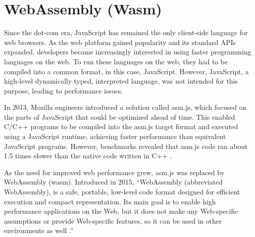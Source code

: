 \chapter{WebAssembly (Wasm)}
\label{chap:wasm}

Since the dot-com era, JavaScript has remained the only client-side language for web browsers. 
As the web platform gained popularity and its standard APIs expanded, developers became increasingly interested in using faster programming languages on the web. 
To run these languages on the web, they had to be compiled into a common format, in this case, JavaScript. However, JavaScript, a high-level dynamically typed, interpreted language, was not intended for this purpose, leading to performance issues.

In 2013, Mozilla engineers introduced a solution called asm.js, which focused on the parts of JavaScript that could be optimized ahead of time. This enabled C/C++ programs to be compiled into the asm.js target format and executed using a JavaScript runtime, 
achieving faster performance than equivalent JavaScript programs. However, benchmarks revealed that asm.js code ran about 1.5 times slower than the native code written in C++ \cite{zakai_2013_gap}.

As the need for improved web performance grew, asm.js was replaced by WebAssembly (wasm). Introduced in 2015, “WebAssembly (abbreviated \Gls{WebAssembly}), is a safe, portable, low-level code format designed for efficient execution and compact representation. 
Its main goal is to enable high performance applications on the Web, but it does not make any Web-specific assumptions or provide Web-specific features, so it can be used in other environments as well \cite[p.~1]{webassemblycommunitygroup_2023_webassembly}.”